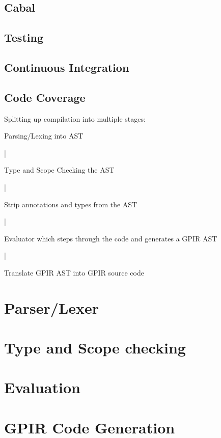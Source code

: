 \subsection{Cabal}
\subsection{Testing}
\subsection{Continuous Integration}
\subsection{Code Coverage}


Splitting up compilation into multiple stages:
    
    Parsing/Lexing into AST

         |

     Type and Scope Checking the AST

         |

     Strip annotations and types from the AST

        |

     Evaluator which steps through the code and generates a 
     GPIR AST

        |

      Translate GPIR AST into GPIR source code

\section{Parser/Lexer}
\section{Type and Scope checking}
\section{Evaluation}
\section{GPIR Code Generation}

